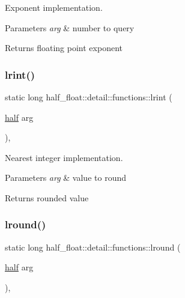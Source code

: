 Exponent implementation. 
\begin{DoxyParams}{Parameters}
{\em arg} & number to query \\
\hline
\end{DoxyParams}
\begin{DoxyReturn}{Returns}
floating point exponent 
\end{DoxyReturn}
\mbox{\label{structhalf__float_1_1detail_1_1functions_a5446ed91e4b33637d20a2a46fc03a97b}} 
\subsubsection{\texorpdfstring{lrint()}{lrint()}}
{\footnotesize\ttfamily static long half\+\_\+float\+::detail\+::functions\+::lrint (\begin{DoxyParamCaption}\item[{\hyperlink{classhalf__float_1_1half}{half}}]{arg }\end{DoxyParamCaption})\hspace{0.3cm}{\ttfamily [inline]}, {\ttfamily [static]}}

Nearest integer implementation. 
\begin{DoxyParams}{Parameters}
{\em arg} & value to round \\
\hline
\end{DoxyParams}
\begin{DoxyReturn}{Returns}
rounded value 
\end{DoxyReturn}
\mbox{\label{structhalf__float_1_1detail_1_1functions_a6b10452ed4a7cc29eb30cce0c449eab0}} 
\subsubsection{\texorpdfstring{lround()}{lround()}}
{\footnotesize\ttfamily static long half\+\_\+float\+::detail\+::functions\+::lround (\begin{DoxyParamCaption}\item[{\hyperlink{classhalf__float_1_1half}{half}}]{arg }\end{DoxyParamCaption})\hspace{0.3cm}{\ttfamily [inline]}, {\ttfamily [static]}}

